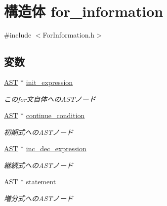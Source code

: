 \hypertarget{structfor__information}{
\section{構造体 for\_\-information}
\label{structfor__information}
}


{\ttfamily \#include $<$ForInformation.h$>$}

\subsection*{変数}
\begin{DoxyCompactItemize}
\item 
\hypertarget{structfor__information_a744fb3a7b36dfd65aafbc1a8e39c137d}{
\hyperlink{structabstract__syntax__tree}{AST} $\ast$ \hyperlink{structfor__information_a744fb3a7b36dfd65aafbc1a8e39c137d}{init\_\-expression}}
\label{structfor__information_a744fb3a7b36dfd65aafbc1a8e39c137d}

\begin{DoxyCompactList}\small\item\em このfor文自体へのASTノード \item\end{DoxyCompactList}\item 
\hypertarget{structfor__information_a6fdc047d1c19f69e884c929688bf70e6}{
\hyperlink{structabstract__syntax__tree}{AST} $\ast$ \hyperlink{structfor__information_a6fdc047d1c19f69e884c929688bf70e6}{continue\_\-condition}}
\label{structfor__information_a6fdc047d1c19f69e884c929688bf70e6}

\begin{DoxyCompactList}\small\item\em 初期式へのASTノード \item\end{DoxyCompactList}\item 
\hypertarget{structfor__information_a694fedfacd9dab80421b098d5040f28d}{
\hyperlink{structabstract__syntax__tree}{AST} $\ast$ \hyperlink{structfor__information_a694fedfacd9dab80421b098d5040f28d}{inc\_\-dec\_\-expression}}
\label{structfor__information_a694fedfacd9dab80421b098d5040f28d}

\begin{DoxyCompactList}\small\item\em 継続式へのASTノード \item\end{DoxyCompactList}\item 
\hypertarget{structfor__information_ae8f8608451c0048194d39fec93fbcf8b}{
\hyperlink{structabstract__syntax__tree}{AST} $\ast$ \hyperlink{structfor__information_ae8f8608451c0048194d39fec93fbcf8b}{statement}}
\label{structfor__information_ae8f8608451c0048194d39fec93fbcf8b}

\begin{DoxyCompactList}\small\item\em 増分式へのASTノード \item\end{DoxyCompactList}\end{DoxyCompactItemize}


